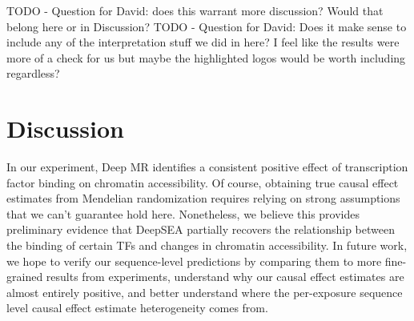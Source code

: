 \documentclass{article}
\begin{document}
TODO - Question for David: does this warrant more discussion? Would that belong here or in Discussion?
TODO - Question for David: Does it make sense to include any of the interpretation stuff we did in here? I feel like the results were more of a check for us but maybe the highlighted logos would be worth including regardless?

\section{Discussion}
In our experiment, Deep MR identifies a consistent positive effect of transcription factor binding on chromatin accessibility. Of course, obtaining true causal effect estimates from Mendelian randomization requires relying on strong assumptions that we can't guarantee hold here. Nonetheless, we believe this provides preliminary evidence that DeepSEA partially recovers the relationship between the binding of certain TFs and changes in chromatin accessibility. In future work, we hope to verify our sequence-level predictions by comparing them to more fine-grained results from experiments, understand why our causal effect estimates are almost entirely positive, and better understand where the per-exposure sequence level causal effect estimate heterogeneity comes from.

\clearpage



\end{document}
